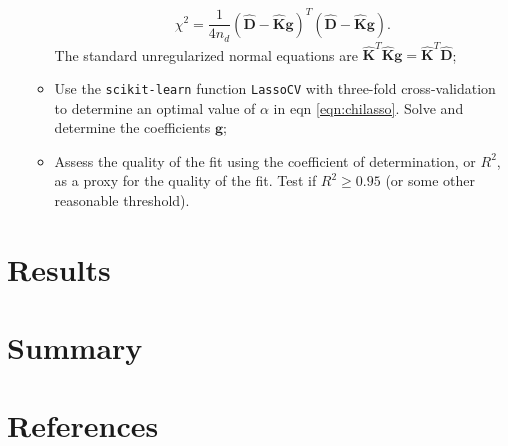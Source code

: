 \documentclass[11pt,letterpaper]{article}
\begin{document}
\begin{enumerate}
\begin{itemize}
\begin{equation}
\chi^2 = \dfrac{1}{4n_d} (\hat{\mathbf{D}} - \hat{\mathbf{K}} \mathbf{g})^T (\hat{\mathbf{D}} - \hat{\mathbf{K}} \mathbf{g}).
\label{eqn:chi2_unreg}
\end{equation}
The standard unregularized normal equations are $\hat{\mathbf{K}}^T \hat{\mathbf{K}} \mathbf{g} = \hat{\mathbf{K}}^T \mathbf{\hat{D}}$;
\item Use the \texttt{scikit-learn} function \texttt{LassoCV} with three-fold cross-validation to determine an optimal value of $\alpha$ in eqn \ref{eqn:chilasso}. Solve and determine the coefficients $\mathbf{g}$;
\item Assess the quality of the fit using the coefficient of determination, or $R^2$, as a proxy for the quality of the fit. Test if $R^2 \ge 0.95$ (or some other reasonable threshold).
\end{itemize}
\end{enumerate}

\section{Results}


\section{Summary}


\section{References}
%
\end{document}
